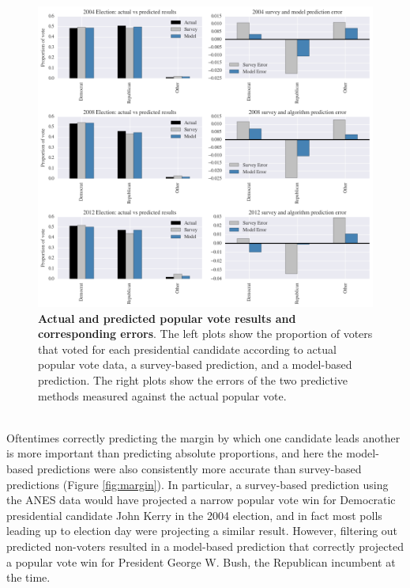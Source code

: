 \documentclass{article}
\begin{document}
	\begin{figure}[h!]
		\begin{center}
			\includegraphics*[width=1\linewidth]{survey_model_error}
			\caption{\textbf{Actual and predicted popular vote results and corresponding errors}. The left plots show the proportion of voters that voted for each presidential candidate according to actual popular vote data, a survey-based prediction, and a model-based prediction. The right plots show the errors of the two predictive methods measured against the actual popular vote.}
			\label{fig:survey_model_error}
		\end{center}
	\end{figure}
	\hfill \\
	Oftentimes correctly predicting the margin by which one candidate leads another is more important than predicting absolute proportions, and here the model-based predictions were also consistently more accurate than survey-based predictions (Figure \ref{fig:margin}). In particular, a survey-based prediction using the ANES data would have projected a narrow popular vote win for Democratic presidential candidate John Kerry in the 2004 election, and in fact most polls leading up to election day were projecting a similar result. However, filtering out predicted non-voters resulted in a model-based prediction that correctly projected a popular vote win for President George W. Bush, the Republican incumbent at the time.
\end{document}
